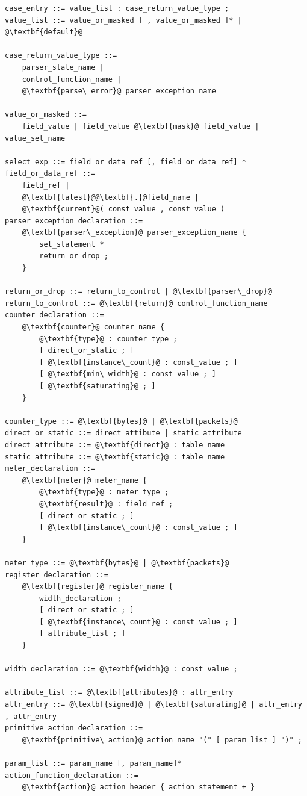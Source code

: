 \documentclass[12pt]{article}
\begin{document}
\begin{lstlisting}[frame=single,backgroundcolor=\color{bnfgreen},escapechar=\@]
case_entry ::= value_list : case_return_value_type ;
value_list ::= value_or_masked [ , value_or_masked ]* | @\textbf{default}@

case_return_value_type ::= 
    parser_state_name | 
    control_function_name | 
    @\textbf{parse\_error}@ parser_exception_name

value_or_masked ::=
    field_value | field_value @\textbf{mask}@ field_value | value_set_name

select_exp ::= field_or_data_ref [, field_or_data_ref] * 
field_or_data_ref ::=
    field_ref |
    @\textbf{latest}@@\textbf{.}@field_name |
    @\textbf{current}@( const_value , const_value )
parser_exception_declaration ::=
    @\textbf{parser\_exception}@ parser_exception_name {
        set_statement *
        return_or_drop ;
    }

return_or_drop ::= return_to_control | @\textbf{parser\_drop}@
return_to_control ::= @\textbf{return}@ control_function_name
counter_declaration ::= 
    @\textbf{counter}@ counter_name {
        @\textbf{type}@ : counter_type ;
        [ direct_or_static ; ]
        [ @\textbf{instance\_count}@ : const_value ; ]
        [ @\textbf{min\_width}@ : const_value ; ]
        [ @\textbf{saturating}@ ; ]
    }

counter_type ::= @\textbf{bytes}@ | @\textbf{packets}@
direct_or_static ::= direct_attibute | static_attribute
direct_attribute ::= @\textbf{direct}@ : table_name
static_attribute ::= @\textbf{static}@ : table_name
meter_declaration ::= 
    @\textbf{meter}@ meter_name {
        @\textbf{type}@ : meter_type ;
        @\textbf{result}@ : field_ref ;
        [ direct_or_static ; ]
        [ @\textbf{instance\_count}@ : const_value ; ]
    }

meter_type ::= @\textbf{bytes}@ | @\textbf{packets}@
register_declaration ::= 
    @\textbf{register}@ register_name {
        width_declaration ;
        [ direct_or_static ; ]
        [ @\textbf{instance\_count}@ : const_value ; ]
        [ attribute_list ; ]
    }

width_declaration ::= @\textbf{width}@ : const_value ;

attribute_list ::= @\textbf{attributes}@ : attr_entry
attr_entry ::= @\textbf{signed}@ | @\textbf{saturating}@ | attr_entry , attr_entry
primitive_action_declaration ::= 
    @\textbf{primitive\_action}@ action_name "(" [ param_list ] ")" ;

param_list ::= param_name [, param_name]*
action_function_declaration ::=
    @\textbf{action}@ action_header { action_statement + }


\end{lstlisting}
\end{document}
